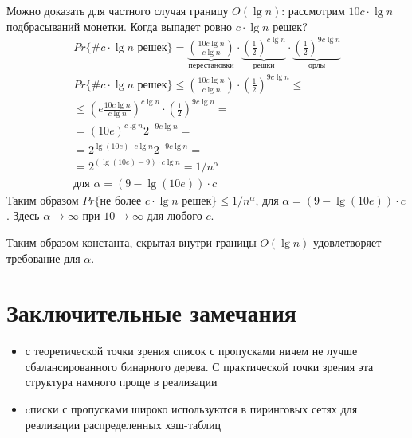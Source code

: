 \documentclass[11pt]{article}
\begin{document}
Можно доказать для частного случая границу $O(\lg n)$: рассмотрим $10 c \cdot \lg n$ подбрасываний монетки. Когда выпадет ровно $c \cdot \lg n$ решек?
\begin{align*}
  Pr\{\# c \cdot \lg n\text{ решек}\} = 
  \underbrace{\binom{10 c \lg n}{c \lg n}}_{\text{перестановки}} \cdot
  \underbrace{{\left(\frac{1}{2}\right)}^{c\lg n}}_{\text{решки}} \cdot
  \underbrace{{\left(\frac{1}{2}\right)}^{9c\lg n}}_{\text{орлы}} \\
  Pr\{\# c \cdot \lg n\text{ решек}\} \leqslant \binom{10 c \lg n}{c \lg n} \cdot
  {\left(\frac{1}{2}\right)}^{9c\lg n} \leqslant \\
  \leqslant {\left(e\frac{10 c \lg n}{c \lg n} \right)}^{c\lg n} \cdot
  {\left(\frac{1}{2}\right)}^{9c\lg n} = \\
  = {(10 e)}^{c \lg n} 2^{-9c\lg n} = \\
  = 2^{\lg{(10 e)}\cdot c \lg n}2^{-9c\lg n} = \\
  = 2^{(\lg{(10 e)}-9) \cdot c \lg n} = 1 / n^\alpha \\
  \text{для }\alpha = (9-\lg{(10 e)}) \cdot c
\end{align*}
Таким образом $Pr\{\text{не более }c\cdot \lg n\text{ решек}\} \leqslant 1/n^\alpha$, для $\alpha = (9-\lg{(10 e)}) \cdot c$. Здесь $\alpha \to \infty$ при $10 \to \infty$ для любого $c$.

Таким образом константа, скрытая внутри границы $O(\lg n)$ удовлетворяет требование для $\alpha$.

\section{Заключительные замечания}
\begin{itemize}
\item с теоретической точки зрения список с пропусками ничем не лучше сбалансированного бинарного дерева. С практической точки зрения эта структура намного проще в реализации
\item cписки с пропусками широко используются в пиринговых сетях для реализации распределенных хэш-таблиц \cite{Stoica01chord:a} \cite{1124030} \cite{Harvey03skipnet:a}
\end{itemize}



\end{document}
